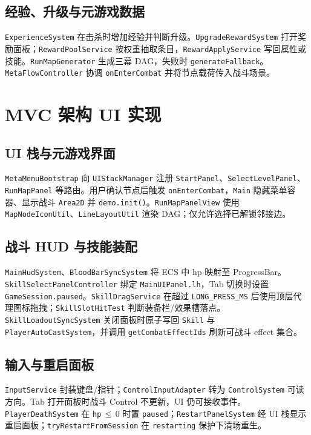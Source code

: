 \documentclass[UTF8,a4paper]{ctexart}
\begin{document}
\subsection{经验、升级与元游戏数据}

\texttt{ExperienceSystem} 在击杀时增加经验并判断升级。\texttt{UpgradeRewardSystem} 打开奖励面板；\texttt{RewardPoolService} 按权重抽取条目，\texttt{RewardApplyService} 写回属性或技能。\texttt{RunMapGenerator} 生成三幕 DAG，失败时 \texttt{generateFallback}。\texttt{MetaFlowController} 协调 \texttt{onEnterCombat} 并将节点载荷传入战斗场景。

\section{MVC 架构 UI 实现}
\label{sec:mvc-impl}

\subsection{UI 栈与元游戏界面}

\texttt{MetaMenuBootstrap} 向 \texttt{UIStackManager} 注册 \texttt{StartPanel}、\texttt{SelectLevelPanel}、\texttt{RunMapPanel} 等路由。用户确认节点后触发 \texttt{onEnterCombat}，\texttt{Main} 隐藏菜单容器、显示战斗 \texttt{Area2D} 并 \texttt{demo.init()}。\texttt{RunMapPanelView} 使用 \texttt{MapNodeIconUtil}、\texttt{LineLayoutUtil} 渲染 DAG；仅允许选择已解锁邻接边。

\subsection{战斗 HUD 与技能装配}

\texttt{MainHudSystem}、\texttt{BloodBarSyncSystem} 将 ECS 中 hp 映射至 ProgressBar。\texttt{SkillSelectPanelController} 绑定 \texttt{MainUIPanel.lh}，Tab 切换时设置 \texttt{GameSession.paused}。\texttt{SkillDragService} 在超过 \texttt{LONG\_PRESS\_MS} 后使用顶层代理图标拖拽；\texttt{SkillSlotHitTest} 判断装备栏/效果槽落点。\texttt{SkillLoadoutSyncSystem} 关闭面板时原子写回 \texttt{Skill} 与 \texttt{PlayerAutoCastSystem}，并调用 \texttt{getCombatEffectIds} 刷新可战斗 effect 集合。

\subsection{输入与重启面板}

\texttt{InputService} 封装键盘/指针；\texttt{ControlInputAdapter} 转为 \texttt{ControlSystem} 可读方向。Tab 打开面板时战斗 Control 不更新，UI 仍可接收事件\cite{heijstek2011empirical}。\texttt{PlayerDeathSystem} 在 \texttt{hp}\,$\leq$\,0 时置 \texttt{paused}；\texttt{RestartPanelSystem} 经 UI 栈显示重启面板；\texttt{tryRestartFromSession} 在 \texttt{restarting} 保护下清场重生。
\end{document}
